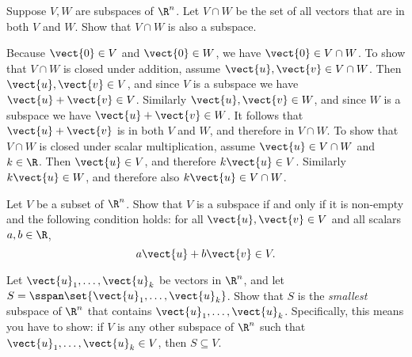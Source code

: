 \begin{ex}
  Suppose $V, W$ are subspaces of $\R^n$. Let $V\cap W$ be the set
  of all vectors that are in both $V$ and $W$. Show that $V\cap W$
  is also a subspace.
  \begin{sol}
    Because $\vect{0}\in V$ and $\vect{0}\in W$, we have
    $\vect{0}\in V\cap W$. To show that $V\cap W$ is closed under
    addition, assume $\vect{u},\vect{v}\in V\cap W$. Then
    $\vect{u},\vect{v}\in V$, and since $V$ is a subspace we have
    $\vect{u}+\vect{v}\in V$. Similarly $\vect{u},\vect{v}\in W$, and
    since $W$ is a subspace we have $\vect{u}+\vect{v}\in W$. It
    follows that $\vect{u}+\vect{v}$ is in both $V$ and $W$, and
    therefore in $V\cap W$. To show that $V\cap W$ is closed under
    scalar multiplication, assume $\vect{u}\in V\cap W$ and
    $k\in\R$. Then $\vect{u}\in V$, and therefore $k\vect{u}\in
    V$. Similarly $k\vect{u}\in W$, and therefore also
    $k\vect{u}\in V\cap W$.
  \end{sol}
\end{ex}

\begin{ex}
  Let $V$ be a subset of $\R^n$. Show that $V$ is a subspace if and
  only if it is non-empty and the following condition holds: for all
  $\vect{u},\vect{v}\in V$ and all scalars $a,b\in\R$,
  \begin{equation*}
    a\vect{u} + b\vect{v} \in V.
  \end{equation*}
\end{ex}

\begin{ex}
  Let $\vect{u}_1,\ldots,\vect{u}_k$ be vectors in $\R^n$, and let
  $S=\sspan\set{\vect{u}_1,\ldots,\vect{u}_k}$. Show that $S$ is the
  {\em smallest} subspace of $\R^n$ that contains
  $\vect{u}_1,\ldots,\vect{u}_k$.  Specifically, this means you have
  to show: if $V$ is any other subspace of $\R^n$ such that
  $\vect{u}_1,\ldots,\vect{u}_k\in V$, then $S\subseteq V$.
\end{ex}

